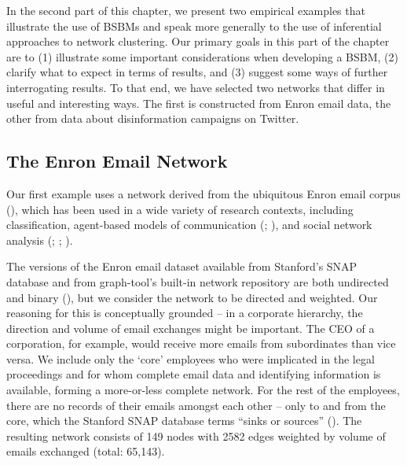 \documentclass[
  12pt,
  a4paper,
  DIV=11,
  numbers=noendperiod,
  twoside,
  open=any]{scrartcl}
\begin{document}
In the second part of this chapter, we present two empirical examples
that illustrate the use of BSBMs and speak more generally to the use of
inferential approaches to network clustering. Our primary goals in this
part of the chapter are to (1) illustrate some important considerations
when developing a BSBM, (2) clarify what to expect in terms of results,
and (3) suggest some ways of further interrogating results. To that end,
we have selected two networks that differ in useful and interesting
ways. The first is constructed from Enron email data, the other from
data about disinformation campaigns on Twitter.

\subsection{The Enron Email Network}\label{the-enron-email-network}

Our first example uses a network derived from the ubiquitous Enron email
corpus (), which
has been used in a wide variety of research contexts, including
classification, agent-based models of communication
(;
), and social
network analysis (;
;
).

The versions of the Enron email dataset available from Stanford's SNAP
database and from graph-tool's built-in network repository are both
undirected and binary (), but we consider the network to be directed and weighted. Our
reasoning for this is conceptually grounded -- in a corporate hierarchy,
the direction and volume of email exchanges might be important. The CEO
of a corporation, for example, would receive more emails from
subordinates than vice versa. We include only the `core' employees who
were implicated in the legal proceedings and for whom complete email
data and identifying information is available, forming a more-or-less
complete network. For the rest of the employees, there are no records of
their emails amongst each other -- only to and from the core, which the
Stanford SNAP database terms ``sinks or sources''
(). The
resulting network consists of 149 nodes with 2582 edges weighted by
volume of emails exchanged (total: 65,143).
\end{document}
